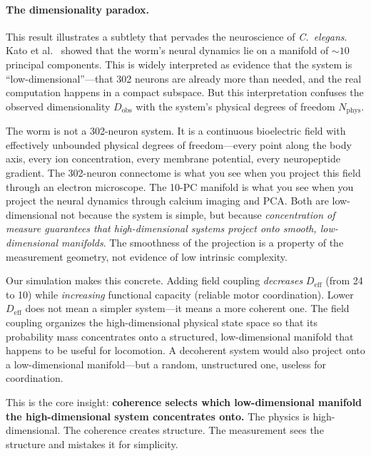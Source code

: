 \documentclass[12pt]{article}
\newcommand{\Deff}{D_{\mathrm{eff}}}
\begin{document}
\paragraph{The dimensionality paradox.} This result illustrates a subtlety that pervades the neuroscience of \textit{C.~elegans}. Kato et al.\ \cite{kato2015} showed that the worm's neural dynamics lie on a manifold of ${\sim}10$ principal components. This is widely interpreted as evidence that the system is ``low-dimensional''---that 302 neurons are already more than needed, and the real computation happens in a compact subspace. But this interpretation confuses the observed dimensionality $D_{\mathrm{obs}}$ with the system's physical degrees of freedom $N_{\mathrm{phys}}$.

The worm is not a 302-neuron system. It is a continuous bioelectric field with effectively unbounded physical degrees of freedom---every point along the body axis, every ion concentration, every membrane potential, every neuropeptide gradient. The 302-neuron connectome is what you see when you project this field through an electron microscope. The 10-PC manifold is what you see when you project the neural dynamics through calcium imaging and PCA. Both are low-dimensional not because the system is simple, but because \textit{concentration of measure guarantees that high-dimensional systems project onto smooth, low-dimensional manifolds}. The smoothness of the projection is a property of the measurement geometry, not evidence of low intrinsic complexity.

Our simulation makes this concrete. Adding field coupling \textit{decreases} $\Deff$ (from 24 to 10) while \textit{increasing} functional capacity (reliable motor coordination). Lower $\Deff$ does not mean a simpler system---it means a more coherent one. The field coupling organizes the high-dimensional physical state space so that its probability mass concentrates onto a structured, low-dimensional manifold that happens to be useful for locomotion. A decoherent system would also project onto a low-dimensional manifold---but a random, unstructured one, useless for coordination.

This is the core insight: \textbf{coherence selects which low-dimensional manifold the high-dimensional system concentrates onto.} The physics is high-dimensional. The coherence creates structure. The measurement sees the structure and mistakes it for simplicity.
\end{document}
